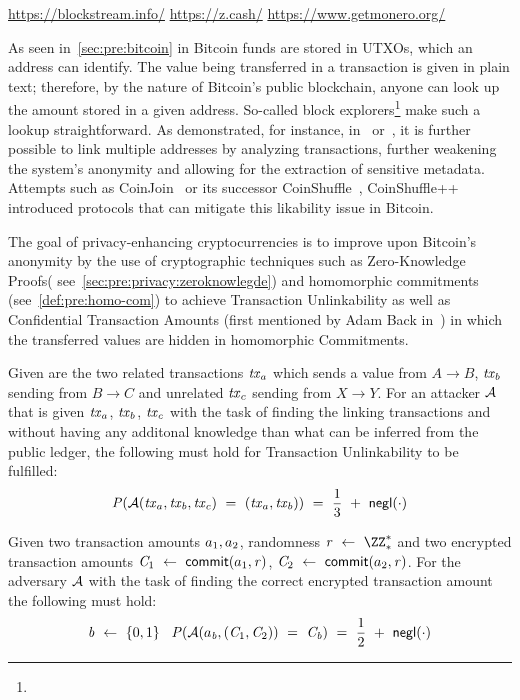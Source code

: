 \urldef\urlblockexp\url{https://blockstream.info/}
\urldef\urlzcash\url{https://z.cash/}
\urldef\urlmonero\url{https://www.getmonero.org/}

As seen in~\cref{sec:pre:bitcoin} in Bitcoin funds are stored in UTXOs, which an address can identify.
The value being transferred in a transaction is given in plain text; therefore, by the nature of Bitcoin’s public blockchain, anyone can look up the amount stored in a given address.
So-called block explorers\footnote{\urlblockexp} make such a lookup straightforward.
As demonstrated, for instance, in~\cite{barber2012bitter} or~\cite{reid2013analysis}, it is further possible to link multiple addresses by analyzing transactions, further weakening the system's anonymity and allowing for the extraction of sensitive metadata.
Attempts such as CoinJoin~\cite{maxwell2013coinjoin} or its successor CoinShuffle~\cite{ruffing2014coinshuffle}, CoinShuffle++~\cite{ruffing2017p2p} introduced protocols that can mitigate this likability issue in Bitcoin.

The goal of privacy-enhancing cryptocurrencies is to improve upon Bitcoin's anonymity by the use of cryptographic techniques such as Zero-Knowledge Proofs( see~\cref{sec:pre:privacy:zeroknowlegde}) and homomorphic commitments (see~\cref{def:pre:homo-com}) to achieve Transaction Unlinkability as well as Confidential Transaction Amounts (first mentioned by Adam Back in~\cite{back2013confidentialtx}) in which the transferred values are hidden in homomorphic Commitments.

\begin{definition} \label{def:pre:privacy:tx-unlink}
    Given are the two related transactions $\mathit{tx}_a$ which sends a value from $A \rightarrow B$, $\mathit{tx}_b$ sending from $B \rightarrow C$ and unrelated $\mathit{tx}_c$ sending from $X \rightarrow Y$.
For an attacker $\mathcal{A}$ that is given $\mathit{tx}_a$, $\mathit{tx}_b$, $\mathit{tx}_c$ with the task of finding the linking transactions and without having any additonal knowledge than what can be inferred from the public ledger, the following must hold for Transaction Unlinkability to be fulfilled:
    \[ \mathit{P}(\mathcal{A}(\mathit{tx}_a, \mathit{tx}_b, \mathit{tx}_c) ~=~ (\mathit{tx}_a, \mathit{tx}_b)) ~=~ \frac{1}{3} ~+~ \mathsf{negl}(\cdot)\]
\end{definition}

\begin{definition} \label{def:pre:privacy:conf-tx}
    Given two transaction amounts $a_1, a_2$, randomness $\varBlindingFactor \opFunResult \cnstIntegersPrimeWithoutZero{*}$ and two encrypted transaction amounts $\mathit{C}_1 ~\leftarrow~ \mathsf{commit}(a_1, \mathit{r})$, $\mathit{C}_2 ~\leftarrow~ \mathsf{commit}(a_2, \mathit{r})$.
For the adversary $\mathcal{A}$ with the task of finding the correct encrypted transaction amount the following must hold:
    \[ \mathit{b} ~\leftarrow~ \{0,1\} \;\;\; \mathit{P}(\mathcal{A}(a_{\mathit{b}}, (\mathit{C}_1, \mathit{C}_2)) ~=~ \mathit{C}_{\mathit{b}}) ~=~ \frac{1}{2} ~+~ \mathsf{negl}(\cdot) \]
\end{definition}

